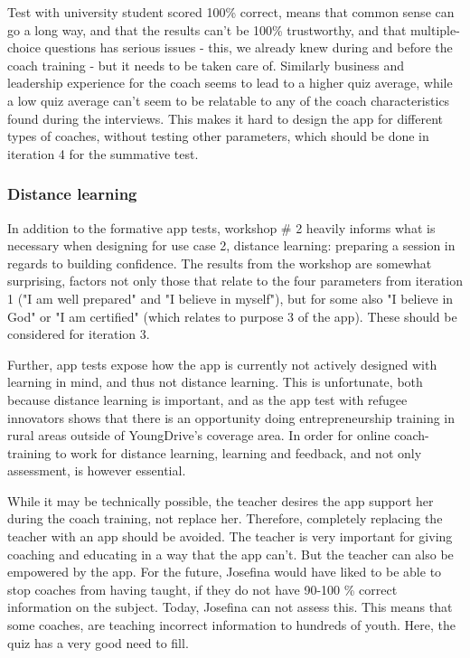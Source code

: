 Test with university student scored 100\% correct, means that common sense can go a long way, and that the results can't be 100\% trustworthy, and that multiple-choice questions has serious issues - this, we already knew during and before the coach training - but it needs to be taken care of. Similarly business and leadership experience for the coach seems to lead to a higher quiz average, while a low quiz average can't seem to be relatable to any of the coach characteristics found during the interviews. This makes it hard to design the app for different types of coaches, without testing other parameters, which should be done in iteration 4 for the summative test.

\subsubsection{Distance learning}
In addition to the formative app tests, workshop \# 2 heavily informs what is necessary when designing for use case 2, distance learning: preparing a session in regards to building confidence. The results from the workshop are somewhat surprising, factors not only those that relate to the four parameters from iteration 1 ("I am well prepared" and "I believe in myself"), but for some also "I believe in God" or "I am certified" (which relates to purpose 3 of the app). These should be considered for iteration 3.

Further, app tests expose how the app is currently not actively designed with learning in mind, and thus not distance learning. This is unfortunate, both because distance learning is important, and as the app test with refugee innovators shows that there is an opportunity doing entrepreneurship training in rural areas outside of YoungDrive's coverage area. In order for online coach-training to work for distance learning, learning and feedback, and not only assessment, is however essential.

While it may be technically possible, the teacher desires the app support her during the coach training, not replace her. Therefore, completely replacing the teacher with an app should be avoided. The teacher is very important for giving coaching and educating in a way that the app can't. But the teacher can also be empowered by the app. For the future, Josefina would have liked to be able to stop coaches from having taught, if they do not have 90-100 \% correct information on the subject. Today, Josefina can not assess this. This means that some coaches, are teaching incorrect information to hundreds of youth. Here, the quiz has a very good need to fill.

